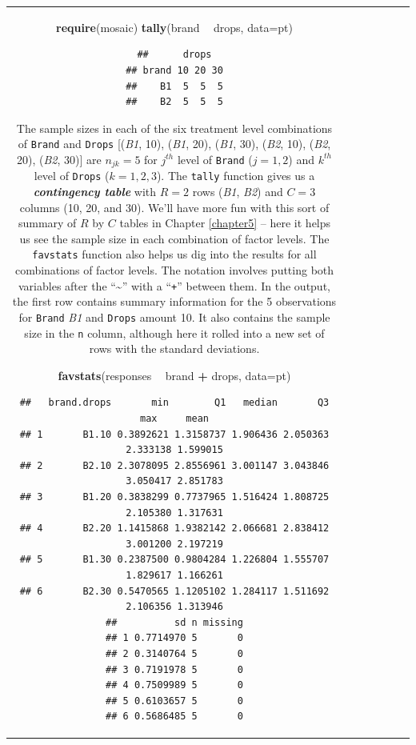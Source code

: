 \documentclass[]{book}
\newenvironment{Shaded}{\begin{snugshade}}{\end{snugshade}}
\newcommand{\KeywordTok}[1]{\textcolor[rgb]{0.13,0.29,0.53}{\textbf{#1}}}
\newcommand{\DataTypeTok}[1]{\textcolor[rgb]{0.13,0.29,0.53}{#1}}
\newcommand{\StringTok}[1]{\textcolor[rgb]{0.31,0.60,0.02}{#1}}
\newcommand{\OperatorTok}[1]{\textcolor[rgb]{0.81,0.36,0.00}{\textbf{#1}}}
\newcommand{\NormalTok}[1]{#1}
\theoremstyle{definition}
\theoremstyle{definition}
\theoremstyle{remark}
\begin{document}
\begin{longtable}[]{@{}ccccccc@{}}
\begin{minipage}[b]{0.10\columnwidth}
\begin{Shaded}
\begin{Highlighting}[]
\KeywordTok{require}\NormalTok{(mosaic)}
\KeywordTok{tally}\NormalTok{(brand }\OperatorTok{~}\StringTok{ }\NormalTok{drops, }\DataTypeTok{data=}\NormalTok{pt)}
\end{Highlighting}
\end{Shaded}

\begin{verbatim}
##      drops
## brand 10 20 30
##    B1  5  5  5
##    B2  5  5  5
\end{verbatim}

The sample sizes in each of the six treatment level combinations of
\texttt{Brand} and \texttt{Drops} {[}(\emph{B1}, 10), (\emph{B1}, 20),
(\emph{B1}, 30), (\emph{B2}, 10), (\emph{B2}, 20), (\emph{B2}, 30){]}
are \(n_{jk} = 5\) for \(j^{th}\) level of \texttt{Brand} (\(j=1, 2\))
and \(k^{th}\) level of \texttt{Drops} (\(k=1, 2, 3\)). The
\texttt{tally} function gives us a \textbf{\emph{contingency table}}
with \(R = 2\) rows (\emph{B1}, \emph{B2}) and \(C = 3\) columns (10,
20, and 30). We'll have more fun with this sort of summary of \(R\) by
\(C\) tables in Chapter \ref{chapter5} -- here it helps us see the
sample size in each combination of factor levels. The \texttt{favstats}
function also helps us dig into the results for all combinations of
factor levels. The notation involves putting both variables after the
``\textasciitilde{}'' with a ``\texttt{+}'' between them. In the output,
the first row contains summary information for the 5 observations for
\texttt{Brand} \emph{B1} and \texttt{Drops} amount 10. It also contains
the sample size in the \texttt{n} column, although here it rolled into a
new set of rows with the standard deviations.

\begin{Shaded}
\begin{Highlighting}[]
\KeywordTok{favstats}\NormalTok{(responses }\OperatorTok{~}\StringTok{ }\NormalTok{brand }\OperatorTok{+}\StringTok{ }\NormalTok{drops, }\DataTypeTok{data=}\NormalTok{pt)}
\end{Highlighting}
\end{Shaded}

\begin{verbatim}
##   brand.drops       min        Q1   median       Q3      max     mean
## 1       B1.10 0.3892621 1.3158737 1.906436 2.050363 2.333138 1.599015
## 2       B2.10 2.3078095 2.8556961 3.001147 3.043846 3.050417 2.851783
## 3       B1.20 0.3838299 0.7737965 1.516424 1.808725 2.105380 1.317631
## 4       B2.20 1.1415868 1.9382142 2.066681 2.838412 3.001200 2.197219
## 5       B1.30 0.2387500 0.9804284 1.226804 1.555707 1.829617 1.166261
## 6       B2.30 0.5470565 1.1205102 1.284117 1.511692 2.106356 1.313946
##          sd n missing
## 1 0.7714970 5       0
## 2 0.3140764 5       0
## 3 0.7191978 5       0
## 4 0.7509989 5       0
## 5 0.6103657 5       0
## 6 0.5686485 5       0
\end{verbatim}


\end{minipage}
\end{longtable}
\end{document}
